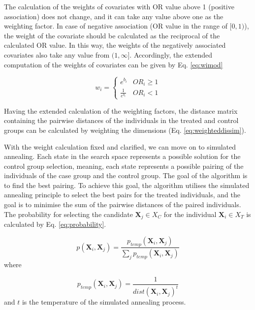 		The calculation of the weights of covariates with OR value above 1 (positive association) does not change, and it can take any value above one as the weighting factor. In case of negative association (OR value in the range of $[0, 1)$), the weight of the covariate should be calculated as the reciprocal of the calculated OR value. In this way, the weights of the negatively associated covariates also take any value from $(1, \infty]$. Accordingly, the extended computation of the weights of covariates can be given by Eq. \ref{eq:wimod}
				
		\begin{equation}
			\label{eq:wimod}
			w_i = \begin{cases}
			e^{b_i} & OR_i \geq 1\\
			\frac{1}{e^{b_i}}& OR_i < 1
			\end{cases}
		\end{equation}
				            
		Having the extended calculation of the weighting factors, the distance matrix containing the pairwise distances of the individuals in the treated and control groups can be calculated by weighting the dimensions (Eq. \ref{eq:weighteddissim}).
		  
		With the weight calculation fixed and clarified, we can move on to simulated annealing. Each state in the search space represents a possible solution for the control group selection, meaning, each state represents a possible pairing of the individuals of the case group and the control group. The goal of the algorithm is to find the best pairing. To achieve this goal, the algorithm utilises the simulated annealing principle to select the best pairs for the treated individuals, and the goal is to minimise the sum of the pairwise distances of the paired individuals. The probability for selecting the candidate $\textbf{X}_j \in X_C$ for the individual $\textbf{X}_i \in X_T$ is calculated by Eq. \ref{eq:probability}.
								
		\begin{equation}
			p(\textbf{X}_i,\textbf{X}_j)= \frac{p_{temp}(\textbf{X}_i,\textbf{X}_j)}{\sum_{j}p_{temp}(\textbf{X}_i,\textbf{X}_j)}
			\label{eq:probability}
		\end{equation}
		where
								
		\begin{equation}
			p_{temp}(\textbf{X}_i,\textbf{X}_j)= \frac{1}{dist(\textbf{X}_i,\textbf{X}_j)^t}
			\label{eq:probabilitytemp}
		\end{equation}
		and $t$ is the temperature of the simulated annealing process.
								
